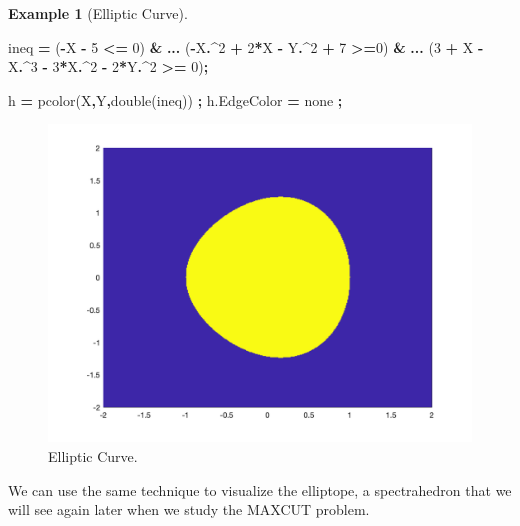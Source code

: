 \documentclass[
]{book}
\newenvironment{Shaded}{\begin{snugshade}}{\end{snugshade}}
\newcommand{\FloatTok}[1]{\textcolor[rgb]{0.00,0.00,0.81}{#1}}
\newcommand{\NormalTok}[1]{#1}
\newcommand{\OperatorTok}[1]{\textcolor[rgb]{0.81,0.36,0.00}{\textbf{#1}}}
\newcommand{\SpecialStringTok}[1]{\textcolor[rgb]{0.31,0.60,0.02}{#1}}
\newcommand{\VariableTok}[1]{\textcolor[rgb]{0.00,0.00,0.00}{#1}}
\theoremstyle{definition}
\theoremstyle{definition}
\newtheorem{example}{Example}[chapter]
\theoremstyle{definition}
\theoremstyle{definition}
\theoremstyle{remark}
\begin{document}
\begin{example}[Elliptic Curve]
\begin{Shaded}
\begin{Highlighting}[]
\VariableTok{ineq} \OperatorTok{=}\NormalTok{ (}\OperatorTok{{-}}\VariableTok{X} \OperatorTok{{-}} \FloatTok{5} \OperatorTok{\textless{}=} \FloatTok{0}\NormalTok{) }\OperatorTok{\&} \OperatorTok{...}
\NormalTok{    (}\OperatorTok{{-}}\VariableTok{X}\OperatorTok{.\^{}}\FloatTok{2} \OperatorTok{+} \FloatTok{2}\OperatorTok{*}\VariableTok{X} \OperatorTok{{-}} \VariableTok{Y}\OperatorTok{.\^{}}\FloatTok{2} \OperatorTok{+} \FloatTok{7} \OperatorTok{\textgreater{}=}\FloatTok{0}\NormalTok{) }\OperatorTok{\&} \OperatorTok{...}
\NormalTok{    (}\FloatTok{3} \OperatorTok{+} \VariableTok{X} \OperatorTok{{-}} \VariableTok{X}\OperatorTok{.\^{}}\FloatTok{3} \OperatorTok{{-}} \FloatTok{3}\OperatorTok{*}\VariableTok{X}\OperatorTok{.\^{}}\FloatTok{2} \OperatorTok{{-}} \FloatTok{2}\OperatorTok{*}\VariableTok{Y}\OperatorTok{.\^{}}\FloatTok{2} \OperatorTok{\textgreater{}=} \FloatTok{0}\NormalTok{)}\OperatorTok{;}

\VariableTok{h} \OperatorTok{=} \VariableTok{pcolor}\NormalTok{(}\VariableTok{X}\OperatorTok{,}\VariableTok{Y}\OperatorTok{,}\VariableTok{double}\NormalTok{(}\VariableTok{ineq}\NormalTok{)) }\OperatorTok{;}
\VariableTok{h}\NormalTok{.}\VariableTok{EdgeColor} \OperatorTok{=} \SpecialStringTok{\textquotesingle{}none\textquotesingle{}} \OperatorTok{;}
\end{Highlighting}
\end{Shaded}

\begin{figure}

{\centering \includegraphics[width=0.6\linewidth]{images/elliptic_curve} 

}

\caption{Elliptic Curve.}\label{fig:EllipticCurve}
\end{figure}

\end{example}

We can use the same technique to visualize the elliptope, a spectrahedron that we will see again later when we study the MAXCUT problem.
\end{document}
